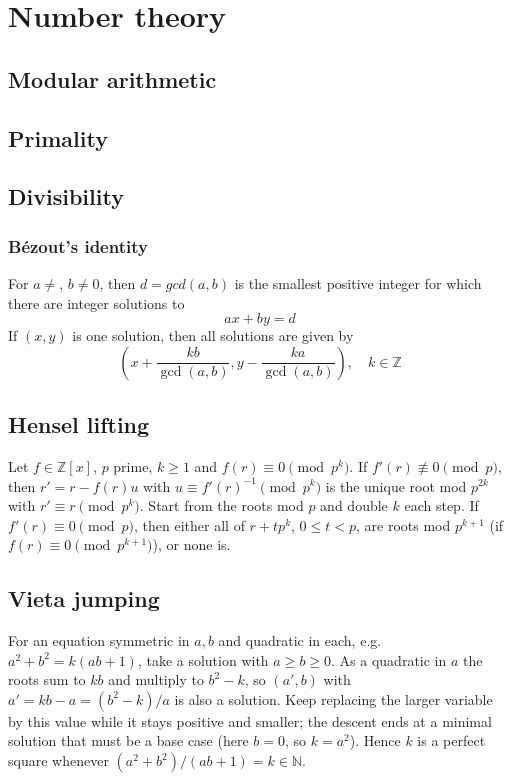 \chapter{Number theory}

\section{Modular arithmetic}

\section{Primality}

\section{Divisibility}

	\subsection{Bézout's identity}
	For $a \neq $, $b \neq 0$, then $d=gcd(a,b)$ is the smallest positive integer for which there are integer solutions to
	$$ax+by=d$$
	If $(x,y)$ is one solution, then all solutions are given by
	$$\left(x+\frac{kb}{\gcd(a,b)}, y-\frac{ka}{\gcd(a,b)}\right), \quad k\in\mathbb{Z}$$


\section{Hensel lifting}
	Let $f \in \mathbb Z[x]$, $p$ prime, $k \ge 1$ and $f(r) \equiv 0 \pmod{p^k}$.
	If $f'(r) \not\equiv 0 \pmod p$, then $r' = r - f(r)u$ with $u \equiv f'(r)^{-1} \pmod{p^k}$
	is the unique root mod $p^{2k}$ with $r' \equiv r \pmod{p^k}$. Start from the roots
	mod $p$ and double $k$ each step. If $f'(r) \equiv 0 \pmod p$, then either all of
	$r + tp^k$, $0 \le t < p$, are roots mod $p^{k+1}$ (if $f(r) \equiv 0 \pmod{p^{k+1}}$), or none is.

\section{Vieta jumping}
	For an equation symmetric in $a,b$ and quadratic in each, e.g.\ $a^2+b^2 = k(ab+1)$,
	take a solution with $a \ge b \ge 0$. As a quadratic in $a$ the roots sum to $kb$ and
	multiply to $b^2-k$, so $(a', b)$ with $a' = kb-a = (b^2-k)/a$ is also a solution.
	Keep replacing the larger variable by this value while it stays positive and smaller;
	the descent ends at a minimal solution that must be a base case (here $b=0$, so $k=a^2$).
	Hence $k$ is a perfect square whenever $(a^2+b^2)/(ab+1) = k \in \mathbb N$.

